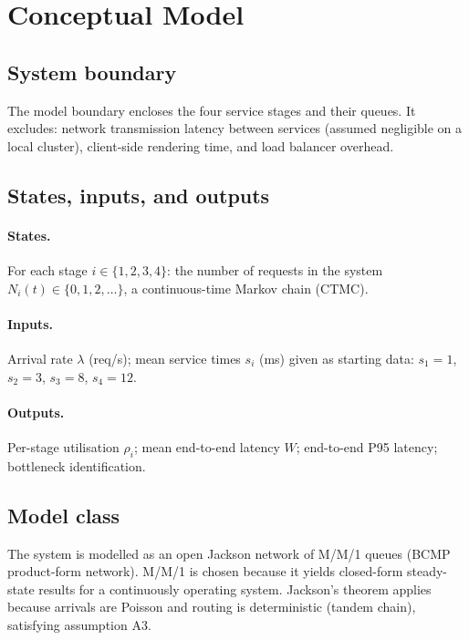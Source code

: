 \documentclass[12pt,a4paper]{article}
\begin{document}
\section{Conceptual Model}
\label{sec:conceptual}

\subsection{System boundary}

The model boundary encloses the four service stages and their queues. It excludes:
network transmission latency between services (assumed negligible on a local cluster),
client-side rendering time, and load balancer overhead.

\subsection{States, inputs, and outputs}

\paragraph{States.} For each stage $i \in \{1,2,3,4\}$: the number of requests in the
system $N_i(t) \in \{0,1,2,\ldots\}$, a continuous-time Markov chain (CTMC).

\paragraph{Inputs.} Arrival rate $\lambda$ (req/s); mean service times $s_i$ (ms) given
as starting data: $s_1=1$, $s_2=3$, $s_3=8$, $s_4=12$.

\paragraph{Outputs.} Per-stage utilisation $\rho_i$; mean end-to-end latency $W$;
end-to-end P95 latency; bottleneck identification.

\subsection{Model class}

The system is modelled as an open Jackson network of M/M/1 queues (BCMP product-form
network). M/M/1 is chosen because it yields closed-form steady-state results for a
continuously operating system. Jackson's theorem applies because arrivals are Poisson
and routing is deterministic (tandem chain), satisfying assumption A3.
\end{document}
